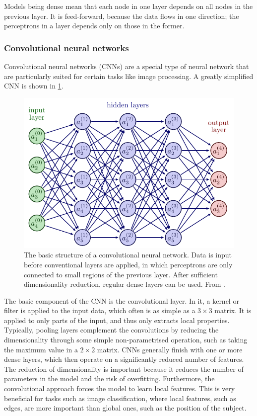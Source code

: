 Models being dense mean that each node in one layer depends on all nodes in the previous layer.
It is feed-forward, because the data flows in one direction; the perceptrons in a layer depends only on those in the former.

\subsubsection{Convolutional neural networks}
\label{sec:cnn}
Convolutional neural networks (CNNs) are a special type of neural network that are particularly suited for certain tasks like image processing.
A greatly simplified CNN is shown in \cref{fig:cnn}.

\begin{figure}
    \centering
    \includegraphics[width=0.75\linewidth, page=7]{neural_networks.pdf}
    \caption{
        The basic structure of a convolutional neural network.
        Data is input before conventional layers are applied, in which perceptrons are only connected to small regions of the previous layer.
        After sufficient dimensionality reduction, regular dense layers can be used.
        From \cite{nn_figs}.
    }
    \label{fig:cnn}
\end{figure}

The basic component of the CNN is the convolutional layer.
In it, a kernel or filter is applied to the input data, which often is as simple as a $3 \times 3$ matrix.
It is applied to only parts of the input, and thus only extracts local properties.
Typically, pooling layers complement the convolutions by reducing the dimensionality through some simple non-parametrised operation, such as taking the maximum value in a $2 \times 2$ matrix.
CNNs generally finish with one or more dense layers, which then operate on a significantly reduced number of features.
The reduction of dimensionality is important because it reduces the number of parameters in the model and the risk of overfitting.
Furthermore, the convolutional approach forces the model to learn local features.
This is very beneficial for tasks such as image classification, where local features, such as edges, are more important than global ones, such as the position of the subject.


